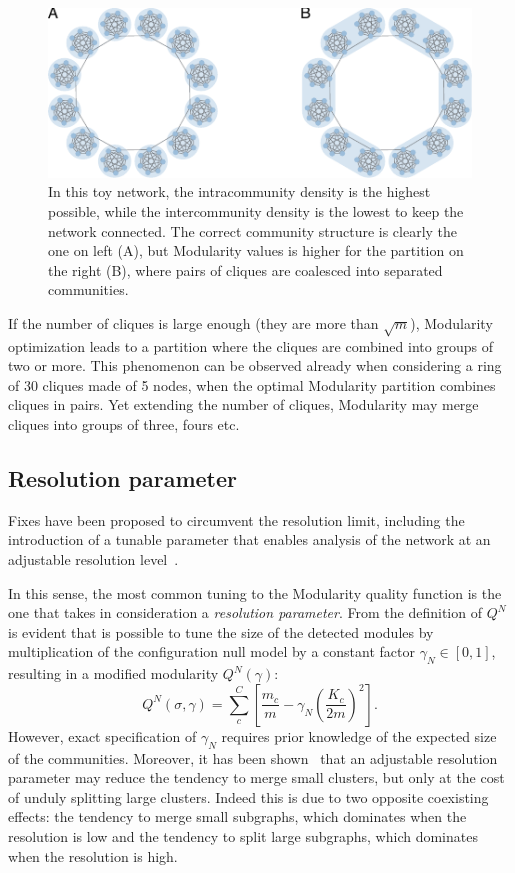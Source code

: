 \begin{figure}[htb!]
\centering
\includegraphics[width=1\textwidth]{images/traag_ring_of_cliques.pdf}
\caption{In this toy network, the intracommunity density is the highest possible, while the intercommunity density is the lowest to keep the network connected. The correct community structure is clearly the one on left (A), but Modularity values is higher for the partition on the right (B), where pairs of cliques are coalesced into separated communities.}
\label{fig:traag_ring_of_cliques}
\end{figure}
If the number of cliques is large enough (they are more than $\sqrt{m}$), Modularity optimization leads to a partition where the cliques are combined into groups of two or more. This phenomenon can be observed already when considering a ring of 30 cliques made of 5 nodes, when the optimal Modularity partition combines cliques in pairs.
Yet extending the number of cliques, Modularity may merge cliques into groups of three, fours etc.

\subsection{Resolution parameter}
Fixes have been proposed to circumvent the resolution limit, including the introduction of a tunable parameter that enables analysis of the network at an adjustable resolution level~\cite{reichardt2006,ronhovde2010,yeo2011}.

In this sense, the most common tuning to the Modularity quality function is the one that takes in consideration a \emph{resolution parameter}.
From the definition of $Q^N$ is evident that is possible to tune the size of the detected modules by multiplication of the configuration null model by a constant factor $\gamma_{N} \in [0,1]$, resulting in a modified modularity $Q^N(\gamma)$:
\begin{equation}
Q^N(\sigma,\gamma) = \sum_c^C \left[ \frac{m_c}{m} - \gamma_{N} \left( \frac{K_c}{2m}\right)^2 \right].
\end{equation}
However, exact specification of $\gamma_{N}$ requires prior knowledge of the expected size of the communities.
Moreover, it has been shown~\cite{lancichinetti2011} that an adjustable resolution parameter may reduce the tendency to merge small clusters, but only at the cost of unduly splitting large clusters. 
Indeed this is due to two opposite coexisting effects: the tendency to merge small subgraphs, which dominates when the resolution is low and the tendency to split large subgraphs, which dominates when the resolution is high.

